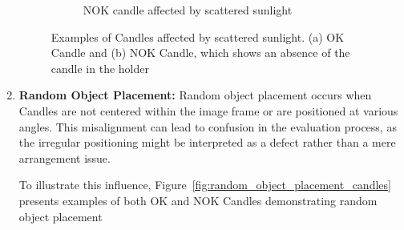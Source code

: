 \documentclass[12pt,DIV14,BCOR12mm,a4paper,footinclude=false,headinclude,parskip=half-,twoside,openright,cleardoublepage=empty,toc=index,bibliography=totoc,listof=totoc]{scrreprt}
\numberwithin{equation}{chapter}
\begin{document}
\begin{enumerate}
\begin{figure}
\begin{subfigure}[b]{0.45\textwidth}
            \caption{NOK candle affected by scattered sunlight}
        \end{subfigure}
        \caption{Examples of Candles affected by scattered sunlight. (a) OK Candle and (b) NOK Candle, which shows an absence of the candle in the holder}
        \label{fig:scattered_sunlight}
    \end{figure}
	\item \textbf{Random Object Placement:} Random object placement occurs when Candles are not centered within the image frame or are positioned at various angles. This misalignment can lead to confusion in the evaluation process, as the irregular positioning might be interpreted as a defect rather than a mere arrangement issue.
	
	To illustrate this influence, Figure~\ref{fig:random_object_placement_candles} presents examples of both OK and NOK Candles demonstrating random object placement
	

\end{enumerate}
\end{document}
